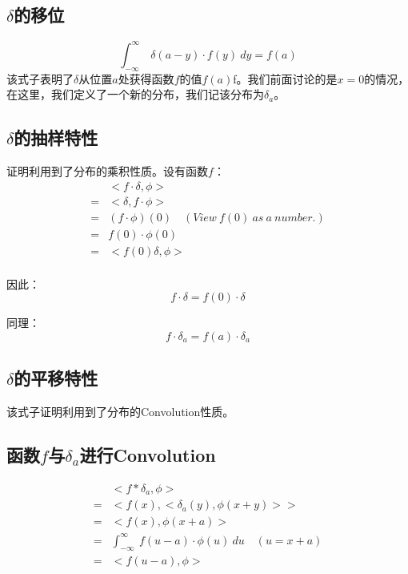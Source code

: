 \subsection{$\delta$的移位}
$$
	\int_{-\infty}^{\infty}\ \delta(a-y)\cdot f(y)\ dy=f(a)
$$
该式子表明了$\delta$从位置$a$处获得函数$f$的值$f(a)$f。我们前面讨论的是$x=0$的情况，在这里，我们定义了一个新的分布，我们记该分布为$\delta_a$。
\subsection{$\delta$的抽样特性}
证明利用到了分布的乘积性质。设有函数$f$：
\begin{align*}
	  & <f\cdot \delta,\phi>                                  \\
	= & <\delta,f\cdot \phi>                                  \\
	= & (f\cdot \phi)(0)   \quad (View\ f(0)\ as\ a\ number.) \\
	= & f(0)\cdot \phi(0)                                     \\
	= & <f(0)\delta,\phi>                                     \\
\end{align*}

因此：
\begin{equation}
	f\cdot \delta=f(0)\cdot \delta
\end{equation}

同理：
\begin{equation}
	f\cdot \delta_a=f(a)\cdot \delta_a
\end{equation}
\subsection{$\delta$的平移特性}
该式子证明利用到了分布的Convolution性质。

\subsection{函数$f$与$\delta_a$进行Convolution}
\begin{align*}
	  & <f*\delta_a,\phi>                                              \\
	= & <f(x),<\delta_a(y),\phi(x+y)>>                                 \\
	= & <f(x),\phi(x+a)>                                               \\
	= & \int_{-\infty}^{\infty}\ f(u-a)\cdot \phi(u)\ du \quad (u=x+a) \\
	= & <f(u-a),\phi>
\end{align*}

